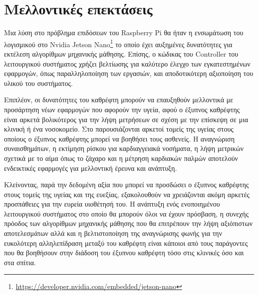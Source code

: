 \section{Μελλοντικές επεκτάσεις}
\label{sec:futures}

Μια λύση στο πρόβλημα επιδόσεων του Raspberry Pi θα ήταν η ενσωμάτωση του λογισμικού στο Nvidia Jetson Nano\footnote{\href{https://developer.nvidia.com/embedded/jetson-nano}{https://developer.nvidia.com/embedded/jetson-nano}} το οποίο έχει αυξημένες δυνατότητες για εκτέλεση αλγορίθμων μηχανικής μάθησης. Επίσης, ο κώδικας του Controller του λειτουργικού συστήματος χρήζει βελτίωσης για καλύτερο έλεγχο των εγκατεστημένων εφαρμογών, όπως παραλληλοποίηση των εργασιών, και αποδοτικότερη αξιοποίηση του υλικού του συστήματος.

Επιπλέον, οι δυνατότητες του καθρέφτη μπορούν να επαυξηθούν μελλοντικά με προσάρτηση νέων εφαρμογών που αφορούν την υγεία, αφού ο έξυπνος καθρέφτης είναι αρκετά βολικότερος για την λήψη μετρήσεων σε σχέση με την επίσκεψη σε μια κλινική ή ένα νοσοκομείο. Στο \cite{reflect_health_paper} παρουσιάζονται αρκετοί τομείς της υγείας στους οποίους ο έξυπνος καθρέφτης μπορεί να βοηθήσει τους ασθενείς. Η αναγνώριση συναισθημάτων, η εκτίμηση ρίσκου για καρδιαγγειακά νοσήματα, η λήψη μετρικών σχετικά με το αίμα όπως το ζάχαρο και η μέτρηση καρδιακών παλμών αποτελούν ενδεικτικές εφαρμογές για μελλοντική έρευνα και ανάπτυξη.

Κλείνοντας, παρά την δεδομένη αξία που μπορεί να προσδώσει ο έξυπνος καθρέφτης στους τομείς της υγείας και της ευεξίας, εξακολουθούν να χρειάζονται ακόμη αρκετές προσπάθειες για την ευρεία υιοθέτησή του. Η ανάπτυξη ενός ενοποιημένου λειτουργικού συστήματος στο οποίο θα μπορούν όλοι να έχουν πρόσβαση, η συνεχής πρόοδος των αλγορίθμων μηχανικής μάθησης που θα επιτρέπουν την λήψη αξιόπιστων αποτελεσμάτων αλλά και η βελτιστοποίηση της αναγνώρισης φωνής για την ευκολότερη αλληλεπίδραση μεταξύ του καθρέφτη είναι κάποιοι από τους παράγοντες που θα βοηθήσουν στην διάδοση του έξυπνου καθρέφτη τόσο στις κλινικές όσο και στα σπίτια.